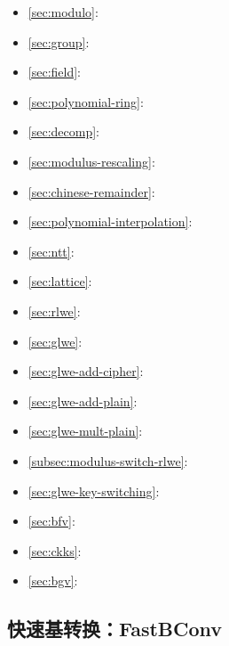 \begin{tcolorbox}[
    title = \textbf{所需背景知识},    %
    colback = white,    %
    colframe = black,  %
    boxrule = 0.8pt,     %
    left = 1mm, right = 1mm, top = 1mm, bottom = 1mm %
]

\begin{itemize}
\item \autoref{sec:modulo}: 
\item \autoref{sec:group}: 
\item \autoref{sec:field}: 
\item \autoref{sec:polynomial-ring}: 
\item \autoref{sec:decomp}: 
\item \autoref{sec:modulus-rescaling}: 
\item \autoref{sec:chinese-remainder}: 
\item \autoref{sec:polynomial-interpolation}: 
\item \autoref{sec:ntt}: 
\item \autoref{sec:lattice}: 
\item \autoref{sec:rlwe}: 
\item \autoref{sec:glwe}: 
\item \autoref{sec:glwe-add-cipher}: 
\item \autoref{sec:glwe-add-plain}: 
\item \autoref{sec:glwe-mult-plain}: 
\item \autoref{subsec:modulus-switch-rlwe}: 
\item \autoref{sec:glwe-key-switching}: 
\item \autoref{sec:bfv}: 
\item \autoref{sec:ckks}: 
\item \autoref{sec:bgv}: 
\end{itemize}
\end{tcolorbox}

\clearpage

\subsection{快速基转换：\textsf{FastBConv}}
\label{subsec:rns-fastbconv}

